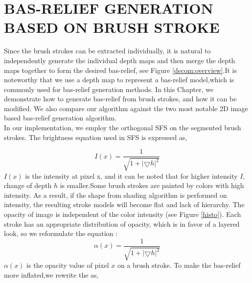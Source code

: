 \chapter{BAS-RELIEF GENERATION BASED ON BRUSH STROKE }
Since the brush strokes can be extracted individually, it is natural to independently generate the individual depth maps and then merge the depth maps together to form the desired bas-relief, see Figure \ref{decom:overview}.It is noteworthy that we use a depth map to represent a bas-relief model,which is commonly used for bas-relief generation methods.   In this Chapter, we demonstrate how to generate bas-relief from brush strokes, and how it can be modified. We also compare our algorithm against the two most notable 2D image based bas-relief generation algorithm. \\
In our implementation, we employ the orthogonal SFS \cite{prados2004unifying} on the segmented brush strokes. The brightness equation used in SFS is expressed as,

\begin{equation*}
I(x)=\frac{1}{\sqrt{1+\lvert \bigtriangledown h \rvert ^2}}
\end{equation*}
$I(x)$ is the intensity at pixel x, and it can be noted that for higher intensity $I$, change of depth $h$ is smaller.Some brush strokes are painted by colors with high intensity. As a result, if the shape from shading algorithm is performed on intensity, the resulting stroke models will become flat and lack of hierarchy. The opacity of image is independent of the color intensity (see Figure \ref{histo}). Each stroke has an appropriate distribution of opacity, which is in favor of a layered look, so we reformulate the equation : 
\begin{equation*}
\alpha(x)=\frac{1}{\sqrt{1+\lvert \bigtriangledown h \rvert ^2}}
\end{equation*}
$\alpha(x)$ is the opacity value of pixel $x$ on a brush stroke. 
To make the bas-relief more inflated,we rewrite the as,


